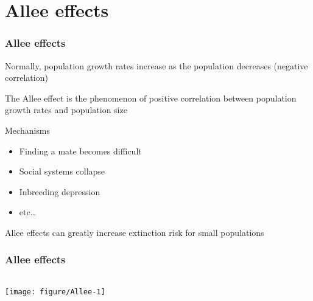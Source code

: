 \documentclass[color=usenames,dvipsnames]{beamer}\usepackage[]{graphicx}\usepackage[]{color}
\begin{document}



\section{Allee effects}



\begin{frame}
  \frametitle{Allee effects}
  {Normally, population growth rates increase as the population
    decreases (negative correlation) \par}
  \pause
  \vfill
  {The Allee effect is the phenomenon of positive correlation
    between population growth rates and population size \par}
  \pause
  \vfill
  {Mechanisms}
  \begin{itemize}
    \item Finding a mate becomes difficult
    \item Social systems collapse
    \item Inbreeding depression
    \item etc\dots
  \end{itemize}
  \pause
  \vfill
  {Allee effects can greatly increase extinction risk for small populations}

\end{frame}



\begin{frame}[fragile]
  \frametitle{Allee effects}

  \begin{columns}
    \column{\dimexpr\paperwidth-10pt}
  \texttt{[image: figure/Allee-1]}
  \end{columns}
\end{frame}
\end{document}
